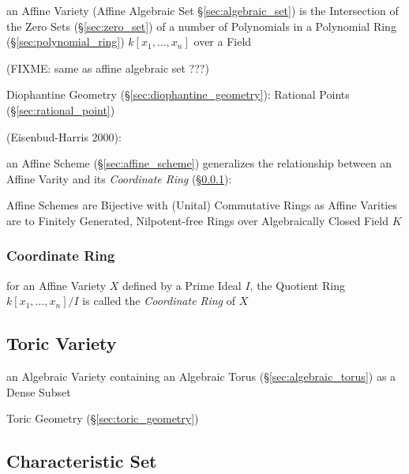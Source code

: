 an Affine Variety (Affine Algebraic Set \S\ref{sec:algebraic_set}) is the
Intersection of the Zero Sets (\S\ref{sec:zero_set}) of a number of Polynomials
in a Polynomial Ring (\S\ref{sec:polynomial_ring}) $k[x_1,\ldots,x_n]$ over a
Field

(FIXME: same as affine algebraic set ???)

\fist Diophantine Geometry (\S\ref{sec:diophantine_geometry}): Rational Points
(\S\ref{sec:rational_point})

(Eisenbud-Harris 2000):

\fist an Affine Scheme (\S\ref{sec:affine_scheme}) generalizes the relationship
between an Affine Varity and its \emph{Coordinate Ring}
(\S\ref{sec:coordinate_ring}):

Affine Schemes are Bijective with (Unital) Commutative Rings as Affine Varities
are to Finitely Generated, Nilpotent-free Rings over Algebraically Closed Field
$K$



\subsubsection{Coordinate Ring}\label{sec:coordinate_ring}

for an Affine Variety $X$ defined by a Prime Ideal $I$, the Quotient Ring
$k[x_1,\ldots,x_n]/I$ is called the \emph{Coordinate Ring} of $X$



\subsection{Toric Variety}\label{sec:toric_variety}

an Algebraic Variety containing an Algebraic Torus (\S\ref{sec:algebraic_torus})
as a Dense Subset

\fist Toric Geometry (\S\ref{sec:toric_geometry})



\subsection{Characteristic Set}\label{sec:characteristic_set}


